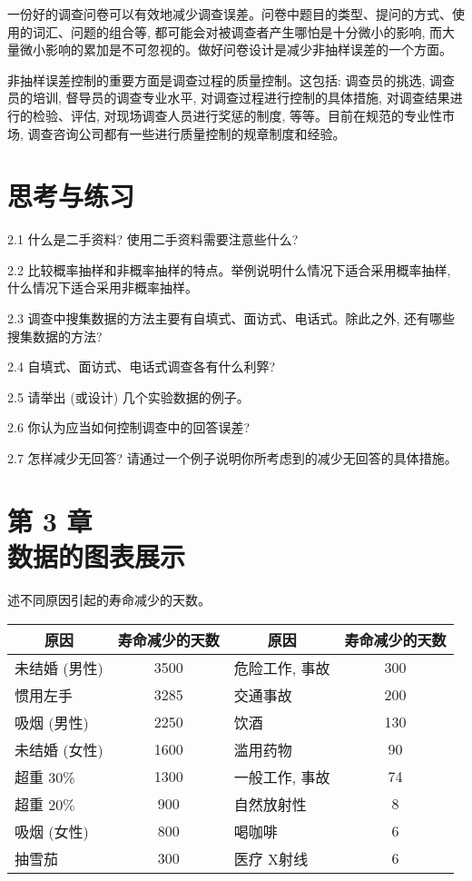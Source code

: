 \documentclass[10pt]{article}
\begin{document}
\begin{CJK*}{UTF8}{bsmi}
一份好的调查问卷可以有效地减少调查误差。问卷中题目的类型、提问的方式、使用的词汇、问题的组合等, 都可能会对被调查者产生哪怕是十分微小的影响, 而大量微小影响的累加是不可忽视的。做好问卷设计是减少非抽样误差的一个方面。

非抽样误差控制的重要方面是调查过程的质量控制。这包括: 调查员的挑选, 调查员的培训, 督导员的调查专业水平, 对调查过程进行控制的具体措施, 对调查结果进行的检验、评估, 对现场调查人员进行奖惩的制度, 等等。目前在规范的专业性市场, 调查咨询公司都有一些进行质量控制的规章制度和经验。

\section*{思考与练习}
2.1 什么是二手资料? 使用二手资料需要注意些什么?

2.2 比较概率抽样和非概率抽样的特点。举例说明什么情况下适合采用概率抽样, 什么情况下适合采用非概率抽样。

2.3 调查中搜集数据的方法主要有自填式、面访式、电话式。除此之外, 还有哪些搜集数据的方法?

2.4 自填式、面访式、电话式调查各有什么利㢣?

2.5 请举出 (或设计) 几个实验数据的例子。

2.6 你认为应当如何控制调查中的回答误差?

2.7 怎样减少无回答? 请通过一个例子说明你所考虑到的减少无回答的具体措施。

\section*{第 3 章 \\
 数据的图表展示}
\begin{center}
\end{center}

述不同原因引起的寿命减少的天数。

\begin{center}
\begin{tabular}{|lc||lc|}
\hline
\multicolumn{1}{c|}{原因} & 寿命减少的天数 & \multicolumn{1}{c|}{原因} & 寿命减少的天数 \\
\hline
未结婚 (男性) & 3500 & 危险工作, 事故 & 300 \\
惯用左手 & 3285 & 交通事故 & 200 \\
吸烟 (男性) & 2250 & 饮酒 & 130 \\
未结婚 (女性) & 1600 & 滥用药物 & 90 \\
超重 30\% & 1300 & 一般工作, 事故 & 74 \\
超重 $20 \%$ & 900 & 自然放射性 & 8 \\
吸烟 (女性) & 800 & 喝咖啡 & 6 \\
抽雪茄 & 300 & 医疗 X射线 & 6 \\
\hline
\end{tabular}
\end{center}


\end{CJK*}
\end{document}
